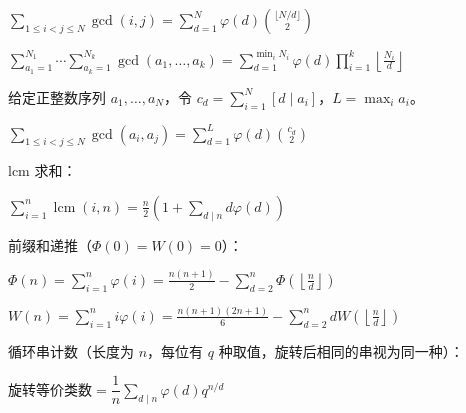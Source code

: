 $\displaystyle\sum_{1\le i<j\le N}\gcd(i,j)=\sum_{d=1}^{N}\varphi(d)\binom{\lfloor N/d\rfloor}{2}$

$\displaystyle\sum_{a_1=1}^{N_1}\cdots\sum_{a_k=1}^{N_k}\gcd(a_1,\dots,a_k)=\sum_{d=1}^{\min_iN_i}\varphi(d)\prod_{i=1}^{k}\left\lfloor\frac{N_i}{d}\right\rfloor$

给定正整数序列 $a_1,\dots,a_N$，令 $c_d=\sum_{i=1}^{N}[d\mid a_i]$，$L=\max_i a_i$。\nopagebreak[4]

$\displaystyle\sum_{1\le i<j\le N}\gcd(a_i,a_j)=\sum_{d=1}^{L}\varphi(d)\binom{c_d}{2}$

lcm 求和：\nopagebreak[4]

$\displaystyle\sum_{i=1}^{n}\operatorname{lcm}(i,n)=\frac n2\left(1+\sum_{d\mid n}d\varphi(d)\right)$

前缀和递推（$\Phi(0)=W(0)=0$）：\nopagebreak[4]

$\Phi(n)=\displaystyle\sum_{i=1}^{n}\varphi(i)=\frac{n(n+1)}2-\sum_{d=2}^{n}\Phi\left(\left\lfloor\frac nd\right\rfloor\right)$

$W(n)=\displaystyle\sum_{i=1}^{n}i\varphi(i)=\frac{n(n+1)(2n+1)}6-\sum_{d=2}^{n}dW\left(\left\lfloor\frac nd\right\rfloor\right)$

循环串计数（长度为 $n$，每位有 $q$ 种取值，旋转后相同的串视为同一种）：\nopagebreak[4]

$\text{旋转等价类数}=\dfrac1n\displaystyle\sum_{d\mid n}\varphi(d)q^{n/d}$
